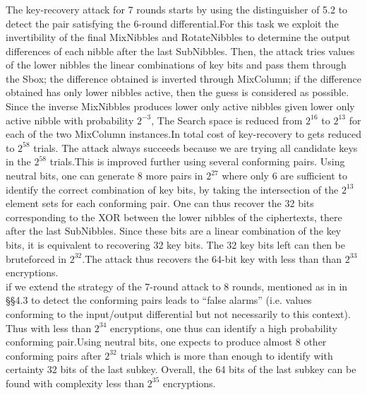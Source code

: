 \documentclass[preprint]{transcrypto}
\begin{document}
\subsubsection{}
The key-recovery attack for 7 rounds starts by using the distinguisher of 5.2 to
detect the pair satisfying the 6-round differential.For this task we exploit the invertibility of the final MixNibbles and RotateNibbles to determine the output differences of each nibble after the last SubNibbles. Then, the attack tries values of the lower nibbles the linear combinations of
key bits and pass them through the Sbox; the difference obtained is inverted
through MixColumn; if the difference obtained has only lower nibbles active, then
the guess is considered as possible. Since the inverse MixNibbles produces lower only active nibbles given lower only active nibble with probability $2^{-3}$, The Search space is reduced from $2^{16}$
to $2^{13}$ for each of the two MixColumn instances.In total cost of key-recovery to gets reduced to $2^{58}$ trials. The attack always succeeds because we are trying all candidate keys in the $2^{58}$ trials.This is improved further using several conforming pairs. Using neutral
bits, one can generate 8 more pairs in $2^27$ where only 6 are sufficient to
identify the correct combination of key bits, by taking the intersection of the $2^{13}$
element sets for each conforming pair. One can thus recover the 32 bits corresponding to the XOR between the lower nibbles of the ciphertexts, there after the last SubNibbles. Since these bits are a linear combination of the key bits, it is equivalent to recovering 32 key bits. The 32 key bits left can then be bruteforced in $2^32$.The attack thus recovers the 64-bit key with less than than $2^{33}$ encryptions.\\

if we extend the strategy of the 7-round attack to 8 rounds, mentioned as in in §§4.3 to detect the conforming pairs leads to “false alarms” (i.e. values conforming to the input/output differential
but not necessarily to this context). Thus with less than $2^{34}$ encryptions, one thus can identify a high probability conforming pair.Using neutral bits, one expects to produce almost 8 other conforming pairs after $2^{32}$ trials which is more than enough to identify with certainty 32 bits
of the last subkey. Overall, the 64 bits of the last subkey can be found with complexity less than
$2^{35}$ encryptions.\\
\end{document}
